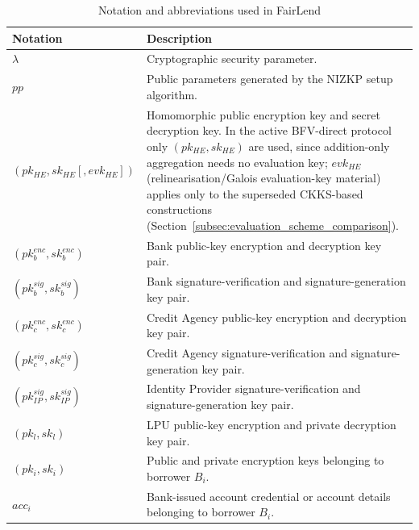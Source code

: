 \documentclass[a4paper,fleqn]{cas-dc}
\begin{document}
\begin{table}[htbp]
\centering
\caption{Notation and abbreviations used in FairLend}
\label{tab:tab1}
\scriptsize
\renewcommand{\arraystretch}{1.15}
\begin{tabular}{|p{2.6cm}|p{11.4cm}|}
\hline
\textbf{Notation} & \textbf{Description} \\
\hline



$\lambda$
& Cryptographic security parameter. \\
\hline

$pp$
& Public parameters generated by the NIZKP setup algorithm. \\
\hline

$(pk_{HE},sk_{HE}[,evk_{HE}])$
& Homomorphic public encryption key and secret decryption key. In the active BFV-direct protocol only $(pk_{HE},sk_{HE})$ are used, since addition-only aggregation needs no evaluation key; $evk_{HE}$ (relinearisation/Galois evaluation-key material) applies only to the superseded CKKS-based constructions (Section~\ref{subsec:evaluation_scheme_comparison}). \\
\hline

$(pk_b^{enc},sk_b^{enc})$
& Bank public-key encryption and decryption key pair. \\
\hline

$(pk_b^{sig},sk_b^{sig})$
& Bank signature-verification and signature-generation key pair. \\
\hline

$(pk_c^{enc},sk_c^{enc})$
& Credit Agency public-key encryption and decryption key pair. \\
\hline

$(pk_c^{sig},sk_c^{sig})$
& Credit Agency signature-verification and signature-generation key pair. \\
\hline

$(pk_{IP}^{sig},sk_{IP}^{sig})$
& Identity Provider signature-verification and signature-generation key pair. \\
\hline

$(pk_l,sk_l)$
& LPU public-key encryption and private decryption key pair. \\
\hline

$(pk_i,sk_i)$
& Public and private encryption keys belonging to borrower $B_i$. \\
\hline

$acc_i$
& Bank-issued account credential or account details belonging to borrower $B_i$. \\
\hline


\end{tabular}
\end{table}
\end{document}
